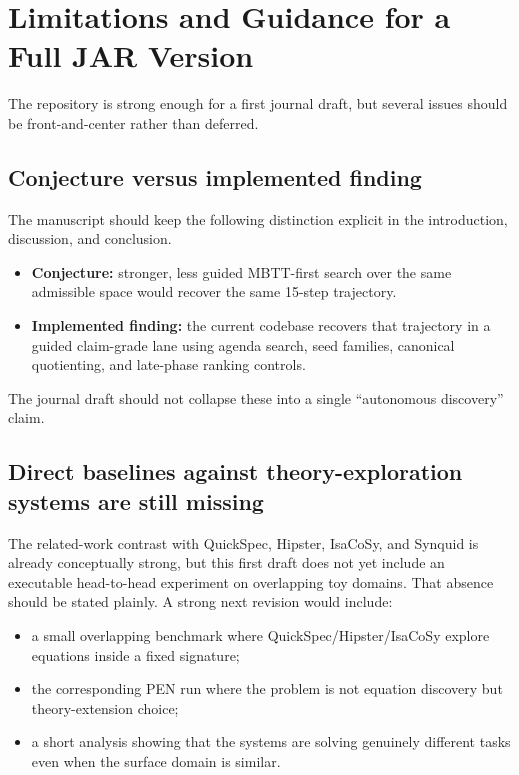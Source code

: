 \documentclass[11pt,a4paper]{article}
\begin{document}
\section{Limitations and Guidance for a Full JAR Version}
\label{sec:limitations}

The repository is strong enough for a first journal draft, but several issues should be front-and-center rather than deferred.

\subsection{Conjecture versus implemented finding}

The manuscript should keep the following distinction explicit in the introduction, discussion, and conclusion.
\begin{itemize}[nosep]
  \item \textbf{Conjecture:} stronger, less guided MBTT-first search over the same admissible space would recover the same 15-step trajectory.
  \item \textbf{Implemented finding:} the current codebase recovers that trajectory in a guided claim-grade lane using agenda search, seed families, canonical quotienting, and late-phase ranking controls.
\end{itemize}
The journal draft should not collapse these into a single ``autonomous discovery'' claim.

\subsection{Direct baselines against theory-exploration systems are still missing}

The related-work contrast with QuickSpec, Hipster, IsaCoSy, and Synquid is already conceptually strong, but this first draft does not yet include an executable head-to-head experiment on overlapping toy domains. That absence should be stated plainly. A strong next revision would include:
\begin{itemize}[nosep]
  \item a small overlapping benchmark where QuickSpec/Hipster/IsaCoSy explore equations inside a fixed signature;
  \item the corresponding PEN run where the problem is not equation discovery but theory-extension choice;
  \item a short analysis showing that the systems are solving genuinely different tasks even when the surface domain is similar.
\end{itemize}
\end{document}
